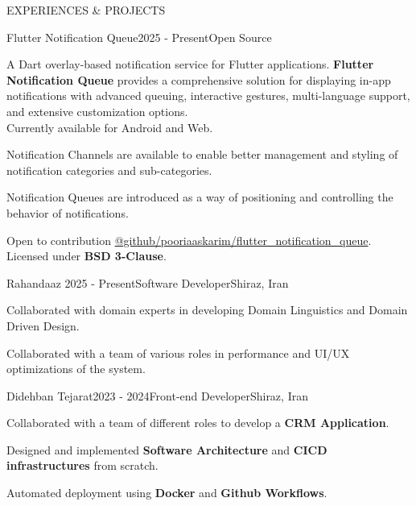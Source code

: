\documentclass[
	a4paper, %
	12pt, %
]{resume} %
\begin{document}
\begin{rSection}{EXPERIENCES \& PROJECTS}
\bigskip
    \begin{rSubsection}{Flutter Notification Queue}{2025 - Present}{Open Source}{}
		\item A Dart overlay-based notification service for Flutter applications. \textbf{Flutter Notification Queue} provides a comprehensive solution for displaying in-app notifications with advanced queuing, interactive gestures, multi-language support, and extensive customization options.\\
        Currently available for Android and Web. 
        \item Notification Channels are available to enable better management and styling of notification categories and sub-categories.
        \item Notification Queues are introduced as a way of positioning and controlling the behavior of notifications.
		\item Open to contribution \href{https://github.com/pooriaaskarim/flutter\_notification\_queue}{@github/pooriaaskarim/flutter\_notification\_queue}.  Licensed under \textbf{BSD 3-Clause}. 
        \\      
	\end{rSubsection}
    
    \begin{rSubsection}{Rahandaaz} {2025 - Present}{Software Developer}{Shiraz, Iran}
		\item Collaborated with domain experts in developing Domain Linguistics and Domain Driven Design.
		\item Collaborated with a team of various roles in performance and UI/UX optimizations of the system.
        \\         
	\end{rSubsection}
    
	\begin{rSubsection}{Didehban Tejarat}{2023 - 2024}{Front-end Developer}{Shiraz, Iran}
		\item Collaborated with a team of different roles to develop a \textbf{CRM Application}.
		\item Designed and implemented \textbf{Software Architecture} and \textbf{CICD infrastructures} from scratch.
        \item Automated deployment using \textbf{Docker} and \textbf{Github Workflows}.
        \\      
	\end{rSubsection}


\end{rSection}
\end{document}
